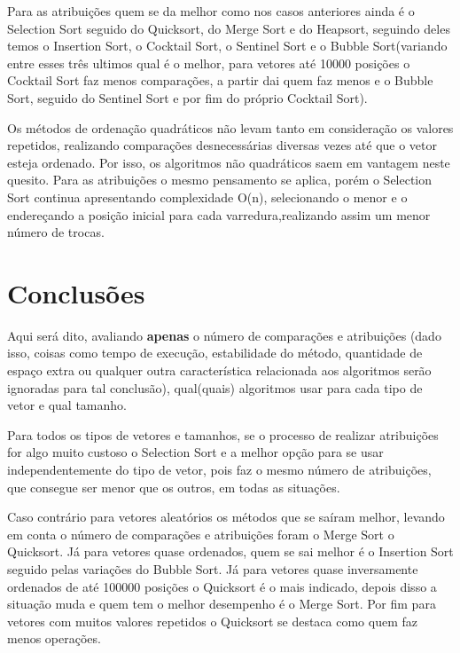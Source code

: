 \documentclass{article}
\begin{document}
\begin{enumerate}
	Para as atribuições quem se da melhor como nos casos anteriores ainda é o Selection Sort seguido do Quicksort, do Merge Sort e do Heapsort, seguindo deles temos o Insertion Sort, o Cocktail Sort, o Sentinel Sort e o Bubble Sort(variando entre esses três ultimos qual é o melhor, para vetores até 10000 posições o Cocktail Sort faz menos comparações, a partir dai quem faz menos e o Bubble Sort, seguido do Sentinel Sort e por fim do próprio Cocktail Sort).
	
	Os métodos de ordenação quadráticos não levam tanto em consideração os valores repetidos, realizando comparações desnecessárias diversas vezes até que o vetor esteja ordenado. Por isso, os algoritmos não quadráticos saem em vantagem neste quesito. Para as atribuições o mesmo pensamento se aplica, porém o Selection Sort continua apresentando complexidade O(n), selecionando o menor e o endereçando a posição inicial para cada varredura,realizando assim um menor número de trocas. 
	
\end{enumerate}
\section{Conclusões}

   Aqui será dito, avaliando \textbf{apenas} o número de comparações e atribuições (dado isso, coisas como tempo de execução, estabilidade do método, quantidade de espaço extra ou qualquer outra característica relacionada aos algoritmos serão ignoradas para tal conclusão), qual(quais) algoritmos usar para cada tipo de vetor e qual tamanho. \par 
    
    Para todos os tipos de vetores e tamanhos, se o processo de realizar atribuições for algo muito custoso o Selection Sort e a melhor opção para se usar independentemente do tipo de vetor, pois faz o mesmo número de atribuições, que consegue ser menor que os outros, em todas as situações.
    
    Caso contrário para vetores aleatórios os métodos que se saíram melhor, levando em conta o número de comparações e atribuições foram o Merge Sort o Quicksort. Já para vetores quase ordenados, quem se sai melhor é o Insertion Sort seguido pelas variações do Bubble Sort. Já para vetores quase inversamente ordenados de até 100000 posições o Quicksort é o mais indicado, depois disso a situação muda e quem tem o melhor desempenho é o Merge Sort. Por fim para vetores com muitos valores repetidos o Quicksort se destaca como quem faz menos operações.
\end{document}
